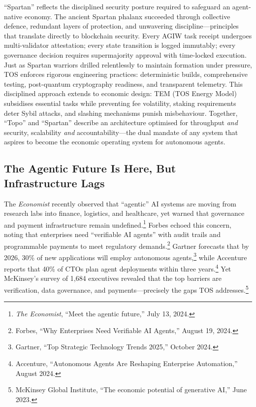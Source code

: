 \documentclass[11pt]{article}
\begin{document}
``Spartan'' reflects the disciplined security posture required to safeguard an agent-native economy. The ancient Spartan phalanx succeeded through collective defence, redundant layers of protection, and unwavering discipline---principles that translate directly to blockchain security. Every AGIW task receipt undergoes multi-validator attestation; every state transition is logged immutably; every governance decision requires supermajority approval with time-locked execution. Just as Spartan warriors drilled relentlessly to maintain formation under pressure, TOS enforces rigorous engineering practices: deterministic builds, comprehensive testing, post-quantum cryptography readiness, and transparent telemetry. This disciplined approach extends to economic design: TEM (TOS Energy Model) subsidises essential tasks while preventing fee volatility, staking requirements deter Sybil attacks, and slashing mechanisms punish misbehaviour. Together, ``Topo'' and ``Spartan'' describe an architecture optimised for throughput \emph{and} security, scalability \emph{and} accountability---the dual mandate of any system that aspires to become the economic operating system for autonomous agents.

\subsection{The Agentic Future Is Here, But Infrastructure Lags}
The \emph{Economist} recently observed that ``agentic'' AI systems are moving from research labs into finance, logistics, and healthcare, yet warned that governance and payment infrastructure remain undefined.\footnote{\emph{The Economist}, ``Meet the agentic future,'' July 13, 2024.} Forbes echoed this concern, noting that enterprises need ``verifiable AI agents'' with audit trails and programmable payments to meet regulatory demands.\footnote{Forbes, ``Why Enterprises Need Verifiable AI Agents,'' August 19, 2024.} Gartner forecasts that by 2026, 30\% of new applications will employ autonomous agents,\footnote{Gartner, ``Top Strategic Technology Trends 2025,'' October 2024.} while Accenture reports that 40\% of CTOs plan agent deployments within three years.\footnote{Accenture, ``Autonomous Agents Are Reshaping Enterprise Automation,'' August 2024.} Yet McKinsey's survey of 1,684 executives revealed that the top barriers are verification, data governance, and payments---precisely the gaps TOS addresses.\footnote{McKinsey Global Institute, ``The economic potential of generative AI,'' June 2023.}
\end{document}
